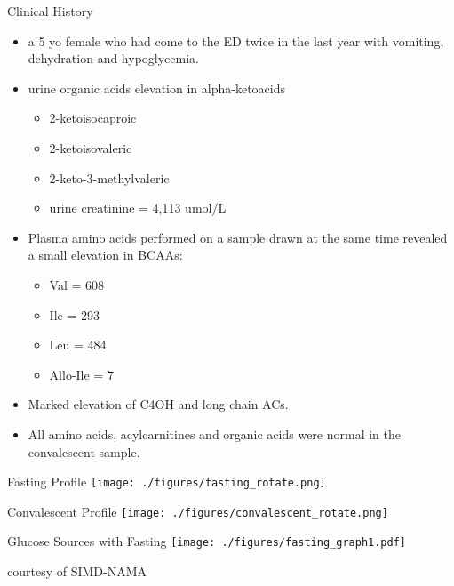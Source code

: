 \documentclass[presentation, smaller]{beamer}
\begin{document}
\begin{frame}[label={sec:orgheadline4}]{Clinical History}
\begin{itemize}
\item a 5 yo female who had come to the ED twice in the last year with
vomiting, dehydration and hypoglycemia.

\item urine organic acids elevation in alpha-ketoacids 
\begin{itemize}
\item 2-ketoisocaproic
\item 2-ketoisovaleric
\item 2-keto-3-methylvaleric
\item urine creatinine = 4,113 umol/L
\end{itemize}

\item Plasma amino acids performed on a sample drawn at the same time
revealed a small elevation in BCAAs:
\begin{itemize}
\item Val = 608
\item Ile = 293
\item Leu = 484
\item Allo-Ile = 7
\end{itemize}

\item Marked elevation of C4OH and long chain ACs.

\item All amino acids, acylcarnitines and organic acids were normal in the convalescent
sample.
\end{itemize}
\end{frame}

\begin{frame}[label={sec:orgheadline5}]{Fasting Profile}
\texttt{[image: ./figures/fasting\_rotate.png]}
\end{frame}

\begin{frame}[label={sec:orgheadline6}]{Convalescent Profile}
\texttt{[image: ./figures/convalescent\_rotate.png]}
\end{frame}

\begin{frame}[label={sec:orgheadline7}]{Glucose Sources with Fasting}
\texttt{[image: ./figures/fasting\_graph1.pdf]}

\tiny
courtesy of SIMD-NAMA
\end{frame}
\end{document}
